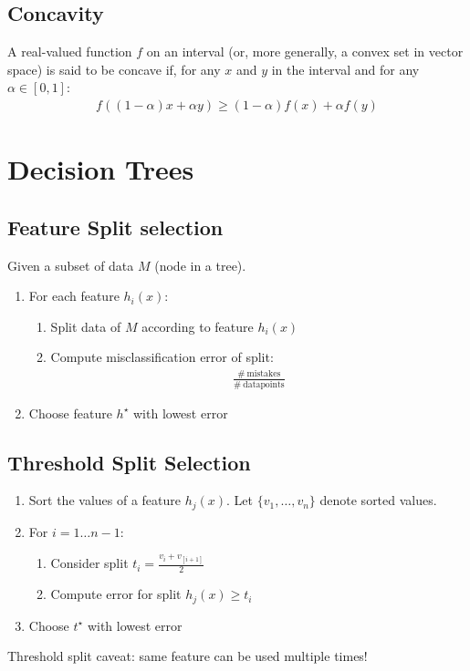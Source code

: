 \documentclass[8pt, a4paper, landscape, includeheadfoot]{extarticle}
\begin{document}
\begin{multicols*}{4}
	\subsection{Concavity}
	A real-valued function $f$	 on an interval (or, more generally, a convex set in vector space) is said to be concave if, for any $x$ and $y$ in the interval and for any $\alpha\in[0,1]$:
	\begin{align*}
		f((1-\alpha )x+\alpha y)\geq (1-\alpha ) f(x)+\alpha f(y)
	\end{align*}

	\section{Decision Trees}
	\subsection{Feature Split selection}
	Given a subset of data $M$ (node in a tree).
	\begin{enumerate}[itemsep=0pt]
		\item For each feature $h_i(x)$:
		      \begin{enumerate}
			      \item Split data of $M$ according to feature $h_i(x)$
			      \item Compute misclassification error of split:
			            \begin{align*}
				            \frac{\# \ \text{mistakes}}{\#\ \text{datapoints}}
			            \end{align*}
		      \end{enumerate}
		\item Choose feature $h^\star$ with lowest error
	\end{enumerate}

	\subsection{Threshold Split Selection}
	\begin{enumerate}[itemsep=0pt]
		\item Sort the values of a feature $h_j(x)$. Let $\{v_1, \dots, v_n\}$ denote sorted values.
		\item For $i = 1\dots n-1$:
		      \begin{enumerate}[itemsep=0pt]
			      \item Consider split $t_i = \frac{v_i + v_[i+1]}{2}$
			      \item Compute error for split $h_j(x)\geq t_i$
		      \end{enumerate}
		\item Choose $t^\star$ with lowest error
	\end{enumerate}
	Threshold split caveat: same feature can be used multiple times!


\end{multicols*}
\end{document}
